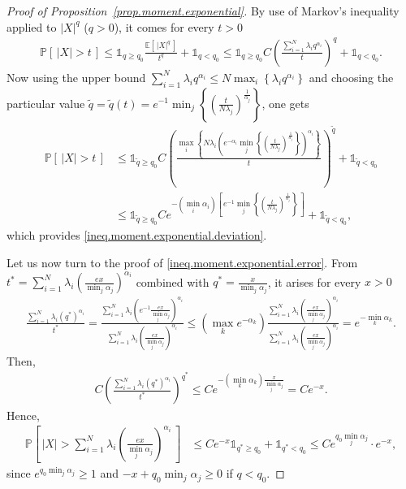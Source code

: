 \documentclass[twoside,11pt]{article}
\numberwithin{equation}{section}
\newcommand{\1}{\mathds{1}}%
\newcommand{\paren}[1]{\left( #1 \right)}
\newcommand{\croch}[1]{\left[\, #1 \,\right]}
\newcommand{\acc}[1]{\left\{ #1 \right\}}
\newcommand{\abs}[1]{\left\lvert #1 \right\rvert} %
\newcommand{\E}{\mathbb{E}}
\renewcommand{\P}{\mathbb{P}}
\numberwithin{equation}{section}
\theoremstyle{plain}
\begin{document}
\begin{proof}[Proof of Proposition~\ref{prop.moment.exponential}]

By use of Markov's inequality applied to $\abs{X}^q$ ($q>0$), it comes for every $t>0$
\begin{align*}
    \P\croch{  \abs{X} >t } \leq  \1_{q \geq q_0} \frac{ \E\croch{ \abs{X}^q }}{t^q} +  \1_{q < q_0} \leq \1_{q \geq q_0} C \paren{ \frac{ \sum_{i=1}^N \lambda_i q^{\alpha_i} }{t} }^q +  \1_{q < q_0} .
\end{align*}
%
Now using the upper bound $\sum_{i=1}^N \lambda_i q^{\alpha_i} \leq N \max_i \acc{\lambda_i q^{\alpha_i}}$ and choosing the particular value $\tilde q = \tilde q(t)= e^{-1} \min_{j} \acc{ \paren{\frac{t}{N \lambda_j}}^{\frac{1}{\alpha_j}} }$, one gets
\begin{align*}
    \P\croch{  \abs{X} >t } & \leq \1_{ \tilde q \geq q_0} C \paren{ \frac{ \max_i \acc{N\lambda_i \paren{e^{-\alpha_i} \min_{j} \acc{ \paren{\frac{t}{N \lambda_j}}^{\frac{1}{\alpha_j}} }}^{\alpha_i}} }{t} }^{\tilde q} +  \1_{ \tilde q < q_0} \\
%
&  \leq \1_{\tilde q \geq q_0} C e^{ -(\min_i\alpha_i)   \croch{ e^{-1} \min_{j} \acc{ \paren{\frac{t}{N \lambda_j}}^{\frac{1}{\alpha_j}} } } } +  \1_{\tilde q < q_0} ,
\end{align*}
which provides \eqref{ineq.moment.exponential.deviation}.

Let us now turn to the proof of \eqref{ineq.moment.exponential.error}.
%
From $t^* = \sum_{i=1}^N\lambda_i \paren{ \frac{e x }{\min_j \alpha_j}}^{\alpha_i}$ combined with $q^* = \frac{x}{\min_j \alpha_j}$, it arises for every $x>0$
\begin{align*}
\frac{ \sum_{i=1}^N \lambda_i (q^*)^{\alpha_i} }{t^*} = \frac{ \sum_{i=1}^N \lambda_i \paren{ e^{-1}\frac{ex}{\min_j \alpha_j} }^{\alpha_i} }{ \sum_{i=1}^N\lambda_i \paren{ \frac{e x }{\min_j \alpha_j}}^{\alpha_i} } \leq \paren{ \max_k e^{-\alpha_k} }  \frac{ \sum_{i=1}^N \lambda_i \paren{\frac{ex}{\min_j \alpha_j} }^{\alpha_i} }{ \sum_{i=1}^N\lambda_i \paren{ \frac{e x }{\min_j \alpha_j}}^{\alpha_i} } =  e^{-\min_k \alpha_k} .
\end{align*}
%
Then,
\begin{align*}
C \paren{ \frac{ \sum_{i=1}^N \lambda_i (q^*)^{\alpha_i} }{t^*} }^{q^*} \leq C e^{- \paren{\min_k \alpha_k} \frac{x}{\min_j \alpha_j} } = C e^{-x} .
\end{align*}
%
Hence,
\begin{align*}
  \P\croch{ \abs{X} > \sum_{i=1}^N \lambda_i \paren{ \frac{e x }{\min_j \alpha_j} }^{\alpha_i} } & \leq C e^{-x} \1_{q^*\geq q_0} + \1_{ q^*< q_0 }  \leq C e^{q_0 \min_j \alpha_j}  \cdot e^{-x} ,
\end{align*}
since $ e^{q_0 \min_j \alpha_j} \geq 1 $ and $ -x + q_0 \min_j \alpha_j \geq 0 $ if $q<q_0$.


\end{proof}
\end{document}
